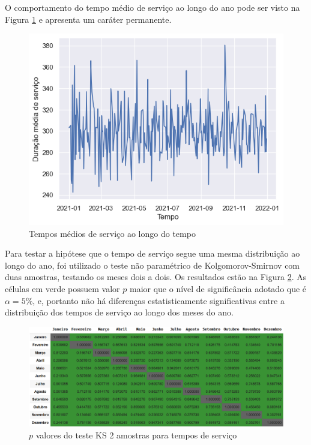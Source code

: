 O comportamento do tempo médio de serviço ao longo do ano pode ser visto na Figura \ref*{fig: t_servico-tempo} e apresenta um caráter permanente.

\begin{figure}[H]
    \includegraphics{analise-de-dados/anual/service_len.png}
    \caption{Tempos médios de serviço ao longo do tempo}
    \label{fig: t_servico-tempo}
\end{figure}

Para testar a hipótese que o tempo de serviço segue uma mesma distribuição ao longo do ano, foi utilizado o teste não paramétrico de Kolgomorov-Smirnov com duas amostras, testando os meses dois a dois. Os resultados estão na Figura \ref*{fig: KS_servico}. As células em verde possuem valor $p$ maior que o nível de significância adotado que é $\alpha = 5\%$, e, portanto não há diferenças estatisticamente significativas entre a distribuição dos tempos de serviço ao longo dos meses do ano.

\begin{figure}[H]
    \includegraphics[scale=0.6]{analise-de-dados/anual/ks-service.png}
    \caption{$p$ valores do teste KS 2 amostras para tempos de serviço}
    \label{fig: KS_servico}
\end{figure}

